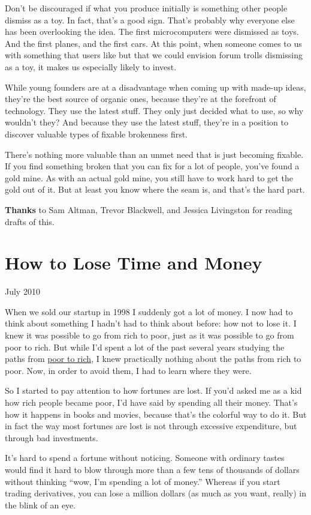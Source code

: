 \documentclass[12pt]{book}
\begin{document}
Don't be discouraged if what you produce initially is something other
people dismiss as a toy. In fact, that's a good sign. That's probably
why everyone else has been overlooking the idea. The first
microcomputers were dismissed as toys. And the first planes, and the
first cars. At this point, when someone comes to us with something that
users like but that we could envision forum trolls dismissing as a toy,
it makes us especially likely to invest.

While young founders are at a disadvantage when coming up with made-up
ideas, they're the best source of organic ones, because they're at the
forefront of technology. They use the latest stuff. They only just
decided what to use, so why wouldn't they? And because they use the
latest stuff, they're in a position to discover valuable types of
fixable brokenness first.

There's nothing more valuable than an unmet need that is just becoming
fixable. If you find something broken that you can fix for a lot of
people, you've found a gold mine. As with an actual gold mine, you still
have to work hard to get the gold out of it. But at least you know where
the seam is, and that's the hard part.


\textbf{Thanks} to Sam Altman, Trevor Blackwell, and Jessica Livingston
for reading drafts of this.
\chapter{How to Lose Time and Money }

July 2010

When we sold our startup in 1998 I suddenly got a lot of money. I now
had to think about something I hadn't had to think about before: how not
to lose it. I knew it was possible to go from rich to poor, just as it
was possible to go from poor to rich. But while I'd spent a lot of the
past several years studying the paths from \href{wealth.html}{poor to
rich}, I knew practically nothing about the paths from rich to poor.
Now, in order to avoid them, I had to learn where they were.

So I started to pay attention to how fortunes are lost. If you'd asked
me as a kid how rich people became poor, I'd have said by spending all
their money. That's how it happens in books and movies, because that's
the colorful way to do it. But in fact the way most fortunes are lost is
not through excessive expenditure, but through bad investments.

It's hard to spend a fortune without noticing. Someone with ordinary
tastes would find it hard to blow through more than a few tens of
thousands of dollars without thinking ``wow, I'm spending a lot of
money.'' Whereas if you start trading derivatives, you can lose a
million dollars (as much as you want, really) in the blink of an eye.
\end{document}
